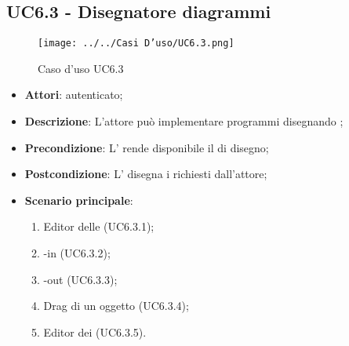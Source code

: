 \subsection{UC6.3 - Disegnatore diagrammi}
\label{ssec:UC6.3}
\begin{figure}[h!]
\centering
\texttt{[image: ../../Casi D'uso/UC6.3.png]}
\caption{Caso d'uso UC6.3}
 \end{figure}
\begin{itemize}
\item \textbf{Attori}:  autenticato;
\item \textbf{Descrizione}: L'attore può implementare programmi disegnando ;
\item \textbf{Precondizione}: L' rende disponibile il  di disegno;
\item \textbf{Postcondizione}: L' disegna i  richiesti dall'attore;
\item \textbf{Scenario principale}: \begin{enumerate}\item Editor  delle  (UC6.3.1);\item {}-in (UC6.3.2);\item {}-out (UC6.3.3);\item Drag di un oggetto (UC6.3.4);\item Editor  dei  (UC6.3.5).
 \end{enumerate}
\end{itemize}
\newpage
